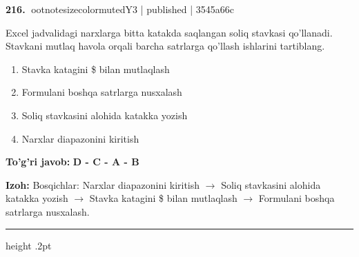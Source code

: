 \documentclass[10pt,a4paper]{article}
\begin{document}
\textbf{\color{ink}216.} {ootnotesizecolor{muted}Y3 | published | 3545a66c}
\par
Excel jadvalidagi narxlarga bitta katakda saqlangan soliq stavkasi qo'llanadi. Stavkani mutlaq havola orqali barcha satrlarga qo'llash ishlarini tartiblang.
\begin{enumerate}[label=\Alph*),leftmargin=9mm]
\item Stavka katagini \$ bilan mutlaqlash
\item Formulani boshqa satrlarga nusxalash
\item Soliq stavkasini alohida katakka yozish
\item Narxlar diapazonini kiritish
\end{enumerate}
\begin{tcolorbox}[enhanced,breakable,colback=teal!4,colframe=teal!55!black,boxrule=0.45pt,arc=1.2mm,left=2.8mm,right=2.8mm,top=2mm,bottom=2mm]
\textbf{\color{teal}To'g'ri javob:} \textbf{D - C - A - B}
\par\smallskip
\textbf{Izoh:} Bosqichlar: Narxlar diapazonini kiritish \ensuremath{\rightarrow} Soliq stavkasini alohida katakka yozish \ensuremath{\rightarrow} Stavka katagini \$ bilan mutlaqlash \ensuremath{\rightarrow} Formulani boshqa satrlarga nusxalash.
\end{tcolorbox}
\vspace{2mm}\hrule height .2pt\vspace{2mm}
\end{document}
